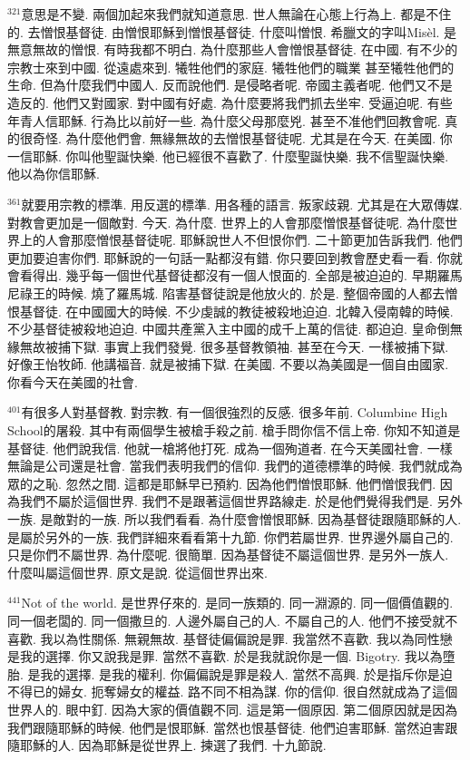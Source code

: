 \documentclass{book}
\begin{document}
$^{321}$意思是不變.
兩個加起來我們就知道意思.
世人無論在心態上行為上.
都是不住的.
去憎恨基督徒.
由憎恨耶穌到憎恨基督徒.
什麼叫憎恨.
希臘文的字叫Misèl.
是無意無故的憎恨.
有時我都不明白.
為什麼那些人會憎恨基督徒.
在中國.
有不少的宗教士來到中國.
從遠處來到.
犧牲他們的家庭.
犧牲他們的職業 甚至犧牲他們的生命.
但為什麼我們中國人.
反而說他們.
是侵略者呢.
帝國主義者呢.
他們又不是造反的.
他們又對國家.
對中國有好處.
為什麼要將我們抓去坐牢.
受逼迫呢.
有些年青人信耶穌.
行為比以前好一些.
為什麼父母那麼兇.
甚至不准他們回教會呢.
真的很奇怪.
為什麼他們會.
無緣無故的去憎恨基督徒呢.
尤其是在今天.
在美國.
你一信耶穌.
你叫他聖誕快樂.
他已經很不喜歡了.
什麼聖誕快樂.
我不信聖誕快樂.
他以為你信耶穌.

$^{361}$就要用宗教的標準.
用反選的標準.
用各種的語言.
叛家歧親.
尤其是在大眾傳媒.
對教會更加是一個敵對.
今天.
為什麼.
世界上的人會那麼憎恨基督徒呢.
為什麼世界上的人會那麼憎恨基督徒呢.
耶穌說世人不但恨你們.
二十節更加告訴我們.
他們更加要迫害你們.
耶穌說的一句話一點都沒有錯.
你只要回到教會歷史看一看.
你就會看得出.
幾乎每一個世代基督徒都沒有一個人恨面的.
全部是被迫迫的.
早期羅馬尼祿王的時候.
燒了羅馬城.
陷害基督徒說是他放火的.
於是.
整個帝國的人都去憎恨基督徒.
在中國國大的時候.
不少虔誠的教徒被殺地迫迫.
北韓入侵南韓的時候.
不少基督徒被殺地迫迫.
中國共產黨入主中國的成千上萬的信徒.
都迫迫.
皇命倒無緣無故被捕下獄.
事實上我們發覺.
很多基督教領袖.
甚至在今天.
一樣被捕下獄.
好像王怡牧師.
他講福音.
就是被捕下獄.
在美國.
不要以為美國是一個自由國家.
你看今天在美國的社會.

$^{401}$有很多人對基督教.
對宗教.
有一個很強烈的反感.
很多年前.
Columbine High School的屠殺.
其中有兩個學生被槍手殺之前.
槍手問你信不信上帝.
你知不知道是基督徒.
他們說我信.
他就一槍將他打死.
成為一個殉道者.
在今天美國社會.
一樣無論是公司還是社會.
當我們表明我們的信仰.
我們的道德標準的時候.
我們就成為眾的之恥.
忽然之間.
這都是耶穌早已預約.
因為他們憎恨耶穌.
他們憎恨我們.
因為我們不屬於這個世界.
我們不是跟著這個世界路線走.
於是他們覺得我們是.
另外一族.
是敵對的一族.
所以我們看看.
為什麼會憎恨耶穌.
因為基督徒跟隨耶穌的人.
是屬於另外的一族.
我們詳細來看看第十九節.
你們若屬世界.
世界邊外屬自己的.
只是你們不屬世界.
為什麼呢.
很簡單.
因為基督徒不屬這個世界.
是另外一族人.
什麼叫屬這個世界.
原文是說.
從這個世界出來.

$^{441}$Not of the world.
是世界仔來的.
是同一族類的.
同一淵源的.
同一個價值觀的.
同一個老闆的.
同一個撒旦的.
人邊外屬自己的人.
不屬自己的人.
他們不接受就不喜歡.
我以為性關係.
無親無故.
基督徒偏偏說是罪.
我當然不喜歡.
我以為同性戀是我的選擇.
你又說我是罪.
當然不喜歡.
於是我就說你是一個.
Bigotry.
我以為墮胎.
是我的選擇.
是我的權利.
你偏偏說是罪是殺人.
當然不高興.
於是指斥你是迫不得已的婦女.
扼奪婦女的權益.
路不同不相為謀.
你的信仰.
很自然就成為了這個世界人的.
眼中釘.
因為大家的價值觀不同.
這是第一個原因.
第二個原因就是因為我們跟隨耶穌的時候.
他們是恨耶穌.
當然也恨基督徒.
他們迫害耶穌.
當然迫害跟隨耶穌的人.
因為耶穌是從世界上.
揀選了我們.
十九節說.
\end{document}
